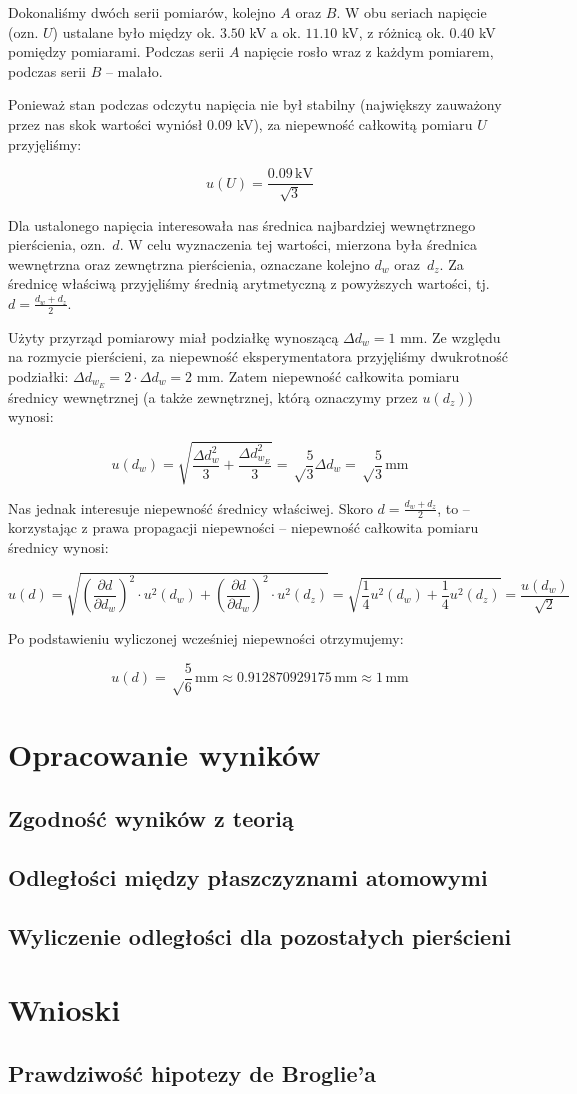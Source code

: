 \documentclass[a4paper]{article}
\newlength{\du}
\begin{document}
Dokonaliśmy dwóch serii pomiarów, kolejno $A$ oraz $B$.
W obu seriach napięcie (ozn. $U$) ustalane było między ok. $3.50$ kV a ok. $11.10$ kV, z różnicą ok. $0.40$ kV pomiędzy pomiarami.
Podczas serii $A$ napięcie rosło wraz z każdym pomiarem, podczas serii $B$ -- malało.

Ponieważ stan podczas odczytu napięcia nie był stabilny (największy zauważony przez nas skok wartości wyniósł $0.09$ kV), za niepewność całkowitą pomiaru $U$ przyjęliśmy:

$$u(U) = \frac{0.09 \, \text{kV}}{\sqrt 3}$$

Dla ustalonego napięcia interesowała nas średnica najbardziej wewnętrznego pierścienia, ozn.~$d$.
W celu wyznaczenia tej wartości, mierzona była średnica wewnętrzna oraz zewnętrzna pierścienia, oznaczane kolejno $d_w$ oraz~$d_z$.
Za średnicę właściwą przyjęliśmy średnią arytmetyczną z powyższych wartości, tj.~$d = \frac {d_w + d_z}{2}$.

Użyty przyrząd pomiarowy miał podziałkę wynoszącą $\Delta d_w = 1$ mm.
Ze względu na rozmycie pierścieni, za niepewność eksperymentatora przyjęliśmy dwukrotność podziałki: $\Delta d_{w_E} = 2 \cdot \Delta d_w = 2$ mm.
Zatem niepewność całkowita pomiaru średnicy wewnętrznej (a także zewnętrznej, którą oznaczymy przez $u(d_z)$) wynosi:

$$u(d_w) = \sqrt{\frac{\Delta d_w^2}{3} + \frac{\Delta d_{w_E}^2}{3}} = \sqrt \frac{5}{3} \Delta d_w = \sqrt \frac{5}{3} \, \text{mm}$$

Nas jednak interesuje niepewność średnicy właściwej.
Skoro $d = \frac {d_w + d_z}{2}$, to -- korzystając z prawa propagacji niepewności -- niepewność całkowita pomiaru średnicy wynosi:

$$u(d) = \sqrt{\left(\frac{\partial d}{\partial d_w}\right)^2 \cdot u^2(d_w) + \left(\frac{\partial d}{\partial d_w}\right)^2 \cdot u^2(d_z)} = \sqrt{\frac{1}{4} u^2(d_w) + \frac{1}{4} u^2(d_z)} = \frac{u(d_w)}{\sqrt{2}}$$

Po podstawieniu wyliczonej wcześniej niepewności otrzymujemy:

$$u(d) = \sqrt \frac{5}{6} \, \text{mm} \approx 0.912870929175 \, \text{mm} \approx 1 \, \text{mm}$$

\section{Opracowanie wyników}

\subsection{Zgodność wyników z teorią}

\subsection{Odległości między płaszczyznami atomowymi}

\subsection{Wyliczenie odległości dla pozostałych pierścieni}

\section{Wnioski}

\subsection{Prawdziwość hipotezy de Broglie'a}
\end{document}
